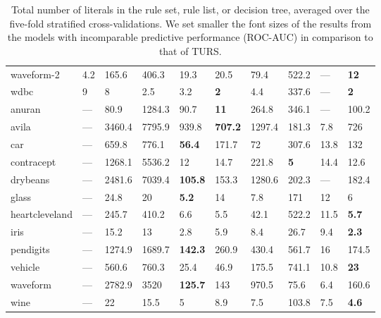 \begin{table}[ht]
\begin{tabular}{l|llllllll|l}
  waveform-2 & \tiny{4.2} & \tiny{165.6} & \tiny{406.3} & 19.3 & \tiny{20.5} & 79.4 & \tiny{522.2} & --- & \textbf{12} \\ 
  wdbc & \tiny{9} & 8 & 2.5 & \tiny{3.2} & \textbf{2} & \tiny{4.4} & \tiny{337.6} & --- & \textbf{2} \\ 
  anuran & --- & 80.9 & 1284.3 & 90.7 & \textbf{11} & 264.8 & 346.1 & --- & 100.2 \\ 
  avila & --- & 3460.4 & 7795.9 & 939.8 & \textbf{707.2} & 1297.4 & \tiny{181.3} & \tiny{7.8} & 726 \\ 
  car & --- & 659.8 & 776.1 & \textbf{56.4} & 171.7 & 72 & 307.6 & \tiny{13.8} & 132 \\ 
  contracept & --- & 1268.1 & 5536.2 & 12 & 14.7 & 221.8 & \textbf{5} & \tiny{14.4} & 12.6 \\ 
  drybeans & --- & 2481.6 & 7039.4 & \textbf{105.8} & 153.3 & 1280.6 & 202.3 & --- & 182.4 \\ 
  glass & --- & 24.8 & 20 & \textbf{5.2} & 14 & 7.8 & 171 & \tiny{12} & 6 \\ 
  heartcleveland & --- & 245.7 & \tiny{410.2} & 6.6 & \tiny{5.5} & 42.1 & 522.2 & \tiny{11.5} & \textbf{5.7} \\ 
  iris & --- & 15.2 & 13 & 2.8 & 5.9 & 8.4 & 26.7 & \tiny{9.4} & \textbf{2.3} \\ 
  pendigits & --- & 1274.9 & 1689.7 & \textbf{142.3} & 260.9 & 430.4 & 561.7 & \tiny{16} & 174.5 \\ 
  vehicle & --- & 560.6 & 760.3 & 25.4 & 46.9 & 175.5 & \tiny{741.1} & \tiny{10.8} & \textbf{23} \\ 
  waveform & --- & 2782.9 & \tiny{3520} & \textbf{125.7} & 143 & \tiny{970.5} & \tiny{75.6} & \tiny{6.4} & 160.6 \\ 
  wine & --- & 22 & 15.5 & 5 & 8.9 & 7.5 & 103.8 & \tiny{7.5} & \textbf{4.6} \\ 
   \hline
\end{tabular}
\caption{Total number of literals in the rule set, rule list, or decision tree, averaged over the five-fold stratified cross-validations. We set smaller the font sizes of the results from the models with incomparable predictive performance (ROC-AUC) in comparison to that of TURS. }
\label{table:num_literal}
\end{table}